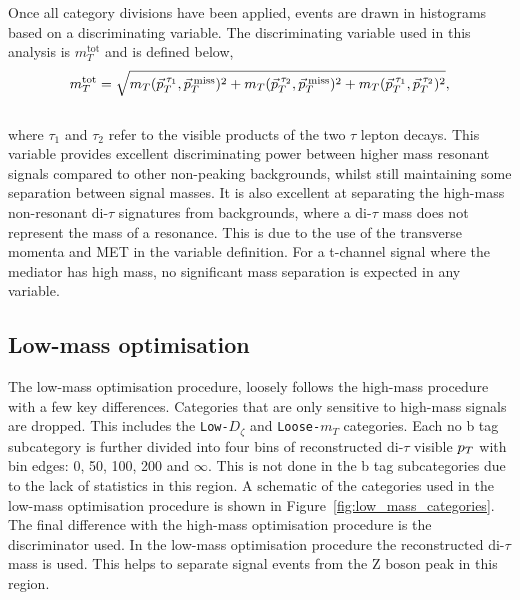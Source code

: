 Once all category divisions have been applied, events are drawn in histograms based on a discriminating variable.
The discriminating variable used in this analysis is $m_{T}^{\text{tot}}$ and is defined below, \\
\begin{equation}
m_{T}^\text{tot} = \sqrt{m_{T}(\vec{p}_{T}^{\hspace{2pt}\tau_1},\vec{p}_{T}^{\hspace{2pt}\text{miss}})^2 +  m_{T}(\vec{p}_{T}^{\hspace{2pt}\tau_2},\vec{p}_{T}^{\hspace{2pt}\text{miss}})^2 + m_{T}(\vec{p}_{T}^{\hspace{2pt}\tau_1},\vec{p}_{T}^{\hspace{2pt}\tau_2})^2},
\label{eqn:mt_tot}
\end{equation} \\
where $\tau_1$ and $\tau_2$ refer to the visible products of the two $\tau$ lepton decays.
This variable provides excellent discriminating power between higher mass resonant signals compared to other non-peaking backgrounds, whilst still maintaining some separation between signal masses.
It is also excellent at separating the high-mass non-resonant di-$\tau$ signatures from backgrounds, where a di-$\tau$ mass does not represent the mass of a resonance.
This is due to the use of the transverse momenta and \ac{MET} in the variable definition.
For a t-channel signal where the mediator has high mass, no significant mass separation is expected in any variable. \\

\subsection{Low-mass optimisation}

The low-mass optimisation procedure, loosely follows the high-mass procedure with a few key differences.
Categories that are only sensitive to high-mass signals are dropped.
This includes the \texttt{Low-$D_\zeta$} and \texttt{Loose-$m_{T}$} categories.
Each no b tag subcategory is further divided into four bins of reconstructed di-$\tau$ visible $p_{T}$ with bin edges: 0, 50, 100, 200 and $\infty$.
This is not done in the b tag subcategories due to the lack of statistics in this region.
A schematic of the categories used in the low-mass optimisation procedure is shown in Figure~\ref{fig:low_mass_categories}.
The final difference with the high-mass optimisation procedure is the discriminator used.
In the low-mass optimisation procedure the reconstructed di-$\tau$ mass is used.
This helps to separate signal events from the Z boson peak in this region. \\

